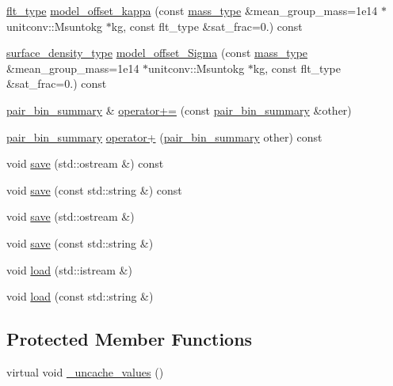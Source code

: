 \begin{DoxyCompactItemize}
\item 
\hyperlink{lib_2IceBRG__main_2common_8h_ad0f130a56eeb944d9ef2692ee881ecc4}{flt\+\_\+type} \hyperlink{classIceBRG_1_1pair__bin__summary_a3f3053c2a1481739b1240dd383803f37}{model\+\_\+offset\+\_\+kappa} (const \hyperlink{namespaceIceBRG_a1be72ac4918a9b029f2eefa084213e35}{mass\+\_\+type} \&mean\+\_\+group\+\_\+mass=1e14 $\ast$unitconv\+::\+Msuntokg $\ast$kg, const flt\+\_\+type \&sat\+\_\+frac=0.) const 
\item 
\hyperlink{namespaceIceBRG_a80c597ef5ba0a32491d32a9f0083b02d}{surface\+\_\+density\+\_\+type} \hyperlink{classIceBRG_1_1pair__bin__summary_a2384801bfcfa8e9fb6ef15b32f7b82ac}{model\+\_\+offset\+\_\+\+Sigma} (const \hyperlink{namespaceIceBRG_a1be72ac4918a9b029f2eefa084213e35}{mass\+\_\+type} \&mean\+\_\+group\+\_\+mass=1e14 $\ast$unitconv\+::\+Msuntokg $\ast$kg, const flt\+\_\+type \&sat\+\_\+frac=0.) const 
\item 
\hyperlink{classIceBRG_1_1pair__bin__summary}{pair\+\_\+bin\+\_\+summary} \& \hyperlink{classIceBRG_1_1pair__bin__summary_aebc85a791164a79fc26ed9997cb26acf}{operator+=} (const \hyperlink{classIceBRG_1_1pair__bin__summary}{pair\+\_\+bin\+\_\+summary} \&other)
\item 
\hyperlink{classIceBRG_1_1pair__bin__summary}{pair\+\_\+bin\+\_\+summary} \hyperlink{classIceBRG_1_1pair__bin__summary_a908cb3b78cca4798d9338530c884d3bd}{operator+} (\hyperlink{classIceBRG_1_1pair__bin__summary}{pair\+\_\+bin\+\_\+summary} other) const 
\item 
void \hyperlink{classIceBRG_1_1pair__bin__summary_a818fdce6a248c3a038d5a6b0dae20cb7}{save} (std\+::ostream \&) const 
\item 
void \hyperlink{classIceBRG_1_1pair__bin__summary_adf616ef4c4ad5da5fcb8c2048cc18cec}{save} (const std\+::string \&) const 
\item 
void \hyperlink{classIceBRG_1_1pair__bin__summary_aaba4acba6e02ac0a8f3c2e79b0d3b559}{save} (std\+::ostream \&)
\item 
void \hyperlink{classIceBRG_1_1pair__bin__summary_ae531783a2847f3db8964cc530996915b}{save} (const std\+::string \&)
\item 
void \hyperlink{classIceBRG_1_1pair__bin__summary_a9189bd4f00779f2a97ed6861a403d7f8}{load} (std\+::istream \&)
\item 
void \hyperlink{classIceBRG_1_1pair__bin__summary_a074dc6d7125ba31b2bb1243d46b09f70}{load} (const std\+::string \&)
\end{DoxyCompactItemize}
\subsection*{Protected Member Functions}
\begin{DoxyCompactItemize}
\item 
virtual void \hyperlink{classIceBRG_1_1pair__bin__summary_a3e0113d3900e9eebb0f80d5681e6dd95}{\+\_\+uncache\+\_\+values} ()
\end{DoxyCompactItemize}
